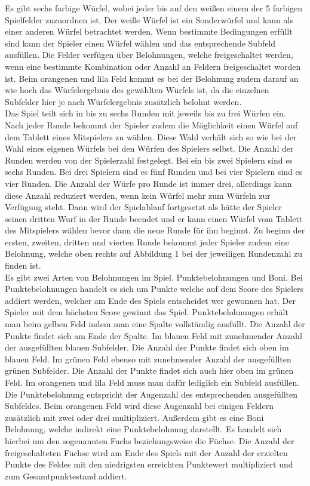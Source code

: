 Es gibt sechs farbige Würfel, wobei jeder bis auf den weißen einem der 5 farbigen Spielfelder zuzuordnen ist. Der weiße Würfel ist ein Sonderwürfel und kann als einer anderen Würfel betrachtet werden. Wenn bestimmte Bedingungen erfüllt sind kann der Spieler einen Würfel wählen und das entsprechende Subfeld ausfüllen. Die Felder verfügen über Belohnungen, welche freigeschaltet werden, wenn eine bestimmte Kombination oder Anzahl an Feldern freigeschaltet worden ist. Beim orangenen und lila Feld kommt es bei der Belohnung zudem darauf an wie hoch das Würfelergebnis des gewählten Würfels ist, da die einzelnen Subfelder hier je nach Würfelergebnis zusätzlich belohnt werden.
\\
Das Spiel teilt sich in bis zu sechs Runden mit jeweils bis zu frei Würfen ein. Nach jeder Runde bekommt der Spieler zudem die Möglichkeit einen Würfel auf dem Tablett eines Mitspielers zu wählen. Diese Wahl verhält sich so wie bei der Wahl eines eigenen Würfels bei den Würfen des Spielers selbst. Die Anzahl der Runden werden von der Spielerzahl festgelegt. Bei ein bis zwei Spielern sind es sechs Runden. Bei drei Spielern sind es fünf Runden und bei vier Spielern sind es vier Runden. Die Anzahl der Würfe pro Runde ist immer drei, allerdings kann diese Anzahl reduziert werden, wenn kein Würfel mehr zum Würfeln zur Verfügung steht. Dann wird der Spielablauf fortgesetzt als hätte der Spieler seinen dritten Wurf in der Runde beendet und er kann einen Würfel vom Tablett des Mitspielers wählen bevor dann die neue Runde für ihn beginnt. Zu beginn der ersten, zweiten, dritten und vierten Runde bekommt jeder Spieler zudem eine Belohnung, welche oben rechts auf Abbildung 1 bei der jeweiligen Rundenzahl zu finden ist.
\\
Es gibt zwei Arten von Belohnungen im Spiel. Punktebelohnungen und Boni. Bei Punktebelohnungen handelt es sich um Punkte welche auf dem Score des Spielers addiert werden, welcher am Ende des Spiels entscheidet wer gewonnen hat. Der Spieler mit dem höchsten Score gewinnt das Spiel. Punktebelohnungen erhält man beim gelben Feld indem man eine Spalte vollständig ausfüllt. Die Anzahl der Punkte findet sich am Ende der Spalte. Im blauen Feld mit zunehmender Anzahl der ausgefüllten blauen Subfelder. Die Anzahl der Punkte findet sich oben im blauen Feld. Im grünen Feld ebenso mit zunehmender Anzahl der ausgefüllten grünen Subfelder. Die Anzahl der Punkte findet sich auch hier oben im grünen Feld. Im orangenen und lila Feld muss man dafür lediglich ein Subfeld ausfüllen. Die Punktebelohnung entspricht der Augenzahl des entsprechenden ausgefüllten Subfeldes. Beim orangenen Feld wird diese Augenzahl bei einigen Feldern zusätzlich mit zwei oder drei multipliziert. Außerdem gibt es eine Boni Belohnung, welche indirekt eine Punktebelohnung darstellt. Es handelt sich hierbei um den sogenannten Fuchs beziehungsweise die Füchse. Die Anzahl der freigeschalteten Füchse wird am Ende des Spiels mit der Anzahl der erzielten Punkte des Feldes mit den niedrigsten erreichten Punktewert multipliziert und zum Gesamtpunktestand addiert.

